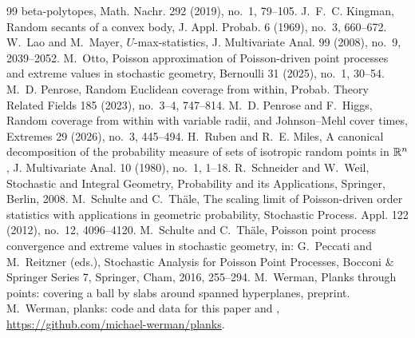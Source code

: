 \documentclass[11pt]{article}
\begin{document}
\begin{thebibliography}{99}
beta-polytopes, Math. Nachr. 292 (2019), no.~1, 79--105.
 J.~F.~C. Kingman, Random secants of a convex body, J. Appl. Probab. 6 (1969), no.~3, 660--672.
 W.~Lao and M.~Mayer, $U$-max-statistics, J. Multivariate Anal. 99 (2008), no.~9, 2039--2052.
 M.~Otto, Poisson approximation of Poisson-driven point processes and extreme values in stochastic
geometry, Bernoulli 31 (2025), no.~1, 30--54.
 M.~D. Penrose, Random Euclidean coverage from within, Probab. Theory Related Fields 185 (2023),
no.~3--4, 747--814.
 M.~D. Penrose and F.~Higgs, Random coverage from within with variable radii, and Johnson--Mehl cover
times, Extremes 29 (2026), no.~3, 445--494.
 H.~Ruben and R.~E. Miles, A canonical decomposition of the probability measure of sets of isotropic random
points in $\mathbb{R}^n$, J. Multivariate Anal. 10 (1980), no.~1, 1--18.
 R.~Schneider and W.~Weil, Stochastic and Integral Geometry, Probability and its Applications, Springer,
Berlin, 2008.
 M.~Schulte and C.~Th\"ale, The scaling limit of Poisson-driven order statistics with applications in
geometric probability, Stochastic Process. Appl. 122 (2012), no.~12, 4096--4120.
 M.~Schulte and C.~Th\"ale, Poisson point process convergence and extreme values in stochastic geometry,
in: G.~Peccati and M.~Reitzner (eds.), Stochastic Analysis for Poisson Point Processes,
Bocconi \& Springer Series 7, Springer, Cham, 2016, 255--294.
 M.~Werman, Planks through points: covering a ball by slabs around spanned hyperplanes, preprint.
 M.~Werman, planks: code and data for this paper and \cite{Companion},
\url{https://github.com/michael-werman/planks}.
\end{thebibliography}
\end{document}
